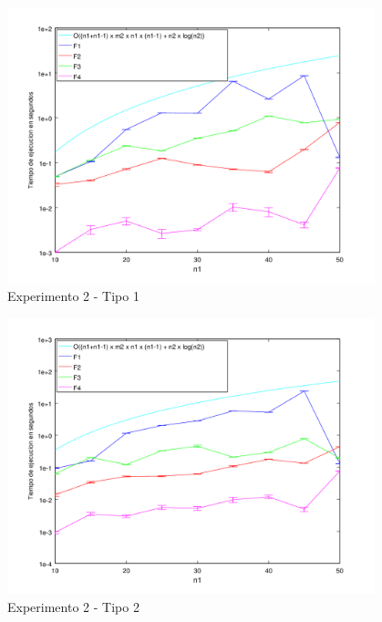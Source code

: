     \begin{figure}[H]
      \includegraphics[height=8cm]{graficos/ejercicio5-exp2-tipo1.png}
       \caption{Experimento 2 - Tipo 1}
	\end{figure}
    
        \begin{figure}[H]
      \includegraphics[height=8cm]{graficos/ejercicio5-exp2-tipo2.png}
       \caption{Experimento 2 - Tipo 2}
	\end{figure}
     	
